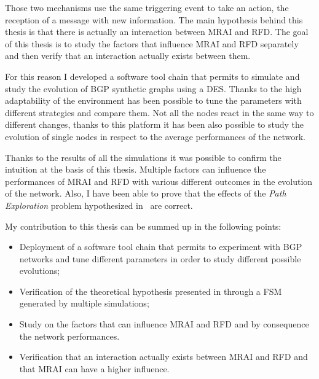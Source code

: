 Those two mechanisms use the same triggering event to take an action, the reception
of a message with new information.
The main hypothesis behind this thesis is that there is actually an interaction
between \ac{MRAI} and \ac{RFD}.
The goal of this thesis is to study the factors that influence \ac{MRAI} and
\ac{RFD} separately and then verify that an interaction actually exists between
them.

For this reason I developed a software tool chain that permits to simulate and
study the evolution of \ac{BGP} synthetic graphs using a \ac{DES}.
Thanks to the high adaptability of the environment has been possible to tune
the parameters with different strategies and compare them.
Not all the nodes react in the same way to different changes, thanks to this
platform it has been also possible to study the evolution of single nodes
in respect to the average performances of the network.

Thanks to the results of all the simulations it was possible to confirm
the intuition at the basis of this thesis.
Multiple factors can influence the performances of \ac{MRAI} and \ac{RFD} with
various different outcomes in the evolution of the network.
Also, I have been able to prove that the effects of the \textit{Path Exploration}
problem hypothesized in~\cite{griffinFSM,fabrikant2011there} are correct.

My contribution to this thesis can be summed up in the following points:
\begin{itemize}
		\item Deployment of a software tool chain that permits to experiment
		with \ac{BGP} networks and tune different parameters in order to study
		different possible evolutions;
		\item Verification of the theoretical hypothesis presented in
		\cite{griffinFSM,fabrikant2011there} through a \ac{FSM} generated by
		multiple simulations;
		\item Study on the factors that can influence \ac{MRAI} and \ac{RFD} and
		by consequence the network performances.
		\item Verification that an interaction actually exists between \ac{MRAI}
		and \ac{RFD} and that \ac{MRAI} can have a higher influence.
\end{itemize}
